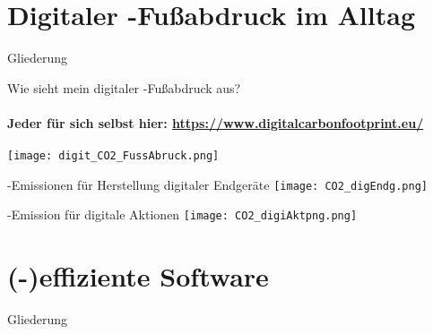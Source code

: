 \section{Digitaler \COz-Fußabdruck im Alltag}
\label{s.digFuss}

\begin{frame}{Gliederung}
\tableofcontents[currentsection]
\end{frame}

\begin{frame}{Wie sieht mein digitaler \COz-Fußabdruck aus?}
     \framesubtitle{Jeder für sich selbst hier: 
		          \href{https://www.digitalcarbonfootprint.eu/}{https://www.digitalcarbonfootprint.eu/} }
	\centering
	\texttt{[image: digit\_CO2\_FussAbruck.png]}\label{fig.digit_CO2_FussAbruck}\infoAbb
\end{frame}


\begin{frame}{\COze-Emissionen  für Herstellung digitaler Endgeräte}
  \texttt{[image: CO2\_digEndg.png]} \\ \hspace*{\fill}
	\label{fig.CO2_digEndg}\infoAbb
\end{frame}
	
\begin{frame}{\COze-Emission für digitale Aktionen}		
		\centering
		\texttt{[image: CO2\_digiAktpng.png]} \\ \hspace*{\fill}
	\label{fig.CO2_digiAkt}\infoAbb
\end{frame}		



\section{(\COz-)effiziente Software}
\label{s.CO2_SW}

\begin{frame}{Gliederung}
\tableofcontents[currentsection]
\end{frame}

